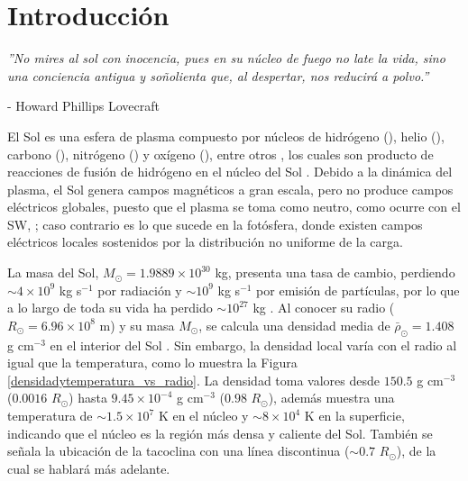 \chapter{Introducción} 


\begin{flushright}
\begin{minipage}{0.6\textwidth}
\raggedleft  %
\footnotesize\itshape
\setlength{\baselineskip}{12pt} 
\vspace{0.3cm} 
''No mires al sol con inocencia,
pues en su núcleo de fuego no late la vida,
sino una conciencia antigua y soñolienta que,
al despertar, nos reducirá a polvo.''

\medskip
\vspace{0.3cm} 
- Howard Phillips Lovecraft
\end{minipage}
\end{flushright}
\vspace{1cm}

El Sol es una esfera de plasma compuesto por núcleos de hidrógeno (), helio (), carbono (), nitrógeno () y oxígeno (), entre otros \parencite[e.g.,][]{asplund-2009, cermak-2025, pottasch-1964, pottasch-1963}, los cuales son producto de reacciones de fusión de hidrógeno en el núcleo del Sol \parencite[e.g.,][]{fiorentini-2004}. Debido a la dinámica del plasma, el Sol genera campos magnéticos a gran escala, pero no produce campos eléctricos globales, puesto que el plasma se toma como neutro, como ocurre con el \ac{SW}, \parencite[e.g.,][]{artemyev-2018, judge-2020}; caso contrario es lo que sucede en la fotósfera, donde existen campos eléctricos locales sostenidos por la distribución no uniforme de la carga.

La masa del Sol, $M_{\odot}=1.9889\times10^{30}$ kg, presenta una tasa de cambio, perdiendo $\sim 4 \times 10^{9}$ kg s$^{-1}$ por radiación y $\sim10^{9}$ kg s$^{-1}$ por emisión de partículas, por lo que a lo largo de toda su vida ha perdido $\sim10^{27}$ kg \parencite[e.g.,][]{stix-2002, pitjeva-2012}. Al conocer su radio ($R_\odot=6.96\times10^{8}$ m) y su masa $M_{\odot}$, se calcula una densidad media de $\bar{\rho}_{\odot}=1.408$ g cm$^{-3}$ en el interior del Sol \parencite[e.g.,][]{rozelot-2018}. Sin embargo, la densidad local varía con el radio al igual que la temperatura, como lo muestra la Figura \ref{densidadytemperatura_vs_radio}. La densidad toma valores desde $150.5$ g cm$^{-3}$ ($0.0016$ $R_\odot$) hasta $9.45 \times 10^{-4}$ g cm$^{-3}$ ($0.98$ $R_\odot$), además muestra una temperatura de $\sim1.5 \times 10^{7}$ K en el núcleo y $\sim8 \times 10^{4}$ K en la superficie, indicando que el núcleo es la región más densa y caliente del Sol. También se señala la ubicación de la tacoclina con una línea discontinua ($\sim 0.7$ $R_\odot$), de la cual se hablará más adelante.

